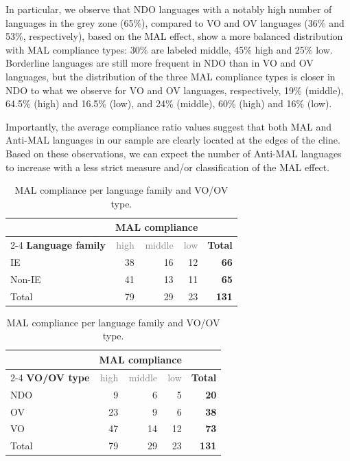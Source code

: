 In particular, we observe that NDO languages with a notably high number of languages in the grey zone (65\%), compared to VO and OV languages (36\% and 53\%, respectively), based on the MAL effect, show a more balanced distribution with MAL compliance types: 30\% are labeled middle, 45\% high and 25\% low. Borderline languages are still more frequent in NDO than in VO and OV languages, but the distribution of the three MAL compliance types is closer in NDO to what we observe for VO and OV languages, respectively, 19\% (middle), 64.5\% (high) and 16.5\% (low), and 24\% (middle), 60\% (high) and 16\% (low).

Importantly, the average compliance ratio values suggest that both MAL and Anti-MAL languages in our sample are clearly located at the edges of the cline. Based on these observations, we can expect the number of Anti-MAL languages to increase with a less strict measure and/or classification of the MAL effect.

\begin{table}[!ht]
\begin{center}
\begin{tabular}{l r r r r}
\toprule
 & \multicolumn{3}{c}{\textbf{MAL compliance}} & \\
\cmidrule(lr){2-4}
\textbf{Language family} & \textcolor{gray}{high} & \textcolor{gray}{middle} & \textcolor{gray}{low} & \textcolor{totalgreen}{\textbf{Total}} \\
\midrule
IE & 38 & 16 & 12 & \textcolor{totalgreen}{\textbf{66}} \\
Non-IE & 41 & 13 & 11 & \textcolor{totalgreen}{\textbf{65}} \\
\rowcolor{rowgray} Total & 79 & 29 & 23 & \textcolor{totalgreen}{\textbf{131}} \\
\bottomrule
\end{tabular}

\vspace{6pt}

\begin{tabular}{l r r r r}
\toprule
 & \multicolumn{3}{c}{\textbf{MAL compliance}} & \\
\cmidrule(lr){2-4}
\textbf{VO/OV type} & \textcolor{gray}{high} & \textcolor{gray}{middle} & \textcolor{gray}{low} & \textcolor{totalgreen}{\textbf{Total}} \\
\midrule
NDO & 9 & 6 & 5 & \textcolor{totalgreen}{\textbf{20}} \\
OV & 23 & 9 & 6 & \textcolor{totalgreen}{\textbf{38}} \\
VO & 47 & 14 & 12 & \textcolor{totalgreen}{\textbf{73}} \\
\rowcolor{rowgray} Total & 79 & 29 & 23 & \textcolor{totalgreen}{\textbf{131}} \\
\bottomrule
\end{tabular}
\caption{MAL compliance per language family and VO/OV type.}
\label{tab:Dec1}
\end{center}
\end{table}

